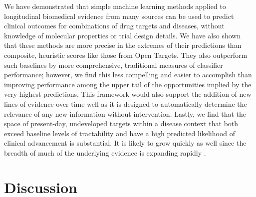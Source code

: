\documentclass{article}
\begin{document}
We have demonstrated that simple machine learning methods applied to longitudinal biomedical evidence from many sources can be used to predict clinical outcomes for combinations of drug targets and diseases, without knowledge of molecular properties or trial design details. We have also shown that these methods are more precise in the extremes of their predictions than composite, heuristic scores like those from Open Targets. They also outperform such baselines by more comprehensive, traditional measures of classifier performance; however, we find this less compelling and easier to accomplish than improving performance among the upper tail of the opportunities implied by the very highest predictions. This framework would also support the addition of new lines of evidence over time well as it is designed to automatically determine the relevance of any new information without intervention.  Lastly, we find that the space of present-day, undeveloped targets within a disease context that both exceed baseline levels of tractability and have a high predicted likelihood of clinical advancement is substantial. It is likely to grow quickly as well since the breadth of much of the underlying evidence is expanding rapidly \cite{PMID:33214558,PMID:36634672,PMID:31491408}.

\section{Discussion}
\label{sec:discussion}
\end{document}
